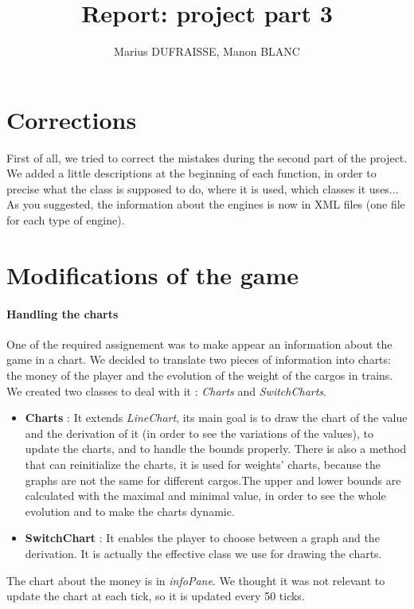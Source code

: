 \documentclass[a4paper]{article}
\title{Report: project part 3}
\author{Marius DUFRAISSE, Manon BLANC}
\date{  }
\begin{document}
	\maketitle
	\thispagestyle{fancy}
	\section{Corrections}
	
	First of all, we tried to correct the mistakes during the second part of the project. We added a little descriptions at the beginning of each function, in order to precise what the class is supposed to do, where it is used, which classes it uses... As you suggested, the information about the engines is now in XML files (one file for each type of engine).
	
	\section{Modifications of the game}
	
	\paragraph{Handling the charts} 
	One of the required assignement was to make appear an information about the game in a chart. We decided to translate two pieces of information into charts: the money of the player and the evolution of the weight of the cargos in trains. We created two classes to deal with it : \textit{Charts} and \textit{SwitchCharts}. 
	\begin{itemize}
		\item \textbf{Charts }: It extends \textit{LineChart}, its main goal is to draw the chart of the value and the derivation of it (in order to see the variations of the values), to update the charts, and to handle the bounds properly. There is also a method that can reinitialize the charts, it is used for weights' charts, because the graphs are not the same for different cargos.The upper and lower bounds are calculated with the maximal and minimal value, in order to see the whole evolution and to make the charts dynamic. 
		\item \textbf{SwitchChart} : It enables the player to choose between a graph and the derivation. It is actually the effective class we use for drawing the charts.
	\end{itemize} 
	The chart about the money is in \textit{infoPane}. We thought it was not relevant to update the chart at each tick, so it is updated every 50 ticks.
\end{document}
